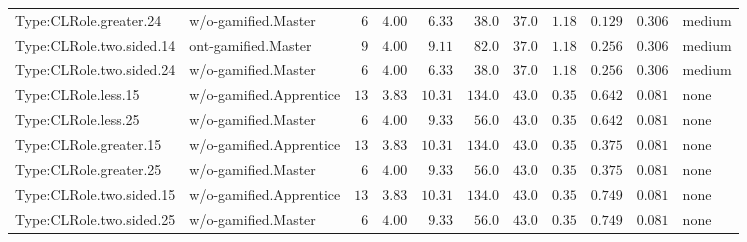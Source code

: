 \documentclass[6pt,a4paper]{article}
\begin{document}
{\begin{longtable}{llrrrrrrrrl}
Type:CLRole.greater.24&w/o-gamified.Master&$ 6$&$4.00$&$ 6.33$&$ 38.0$&$ 37.0$&$ 1.18$&$0.129$&$0.306$&medium\tabularnewline
Type:CLRole.two.sided.14&ont-gamified.Master&$ 9$&$4.00$&$ 9.11$&$ 82.0$&$ 37.0$&$ 1.18$&$0.256$&$0.306$&medium\tabularnewline
Type:CLRole.two.sided.24&w/o-gamified.Master&$ 6$&$4.00$&$ 6.33$&$ 38.0$&$ 37.0$&$ 1.18$&$0.256$&$0.306$&medium\tabularnewline
Type:CLRole.less.15&w/o-gamified.Apprentice&$13$&$3.83$&$10.31$&$134.0$&$ 43.0$&$ 0.35$&$0.642$&$0.081$&none\tabularnewline
Type:CLRole.less.25&w/o-gamified.Master&$ 6$&$4.00$&$ 9.33$&$ 56.0$&$ 43.0$&$ 0.35$&$0.642$&$0.081$&none\tabularnewline
Type:CLRole.greater.15&w/o-gamified.Apprentice&$13$&$3.83$&$10.31$&$134.0$&$ 43.0$&$ 0.35$&$0.375$&$0.081$&none\tabularnewline
Type:CLRole.greater.25&w/o-gamified.Master&$ 6$&$4.00$&$ 9.33$&$ 56.0$&$ 43.0$&$ 0.35$&$0.375$&$0.081$&none\tabularnewline
\newpage
Type:CLRole.two.sided.15&w/o-gamified.Apprentice&$13$&$3.83$&$10.31$&$134.0$&$ 43.0$&$ 0.35$&$0.749$&$0.081$&none\tabularnewline
Type:CLRole.two.sided.25&w/o-gamified.Master&$ 6$&$4.00$&$ 9.33$&$ 56.0$&$ 43.0$&$ 0.35$&$0.749$&$0.081$&none\tabularnewline
\hline
\end{longtable}}
\end{document}
